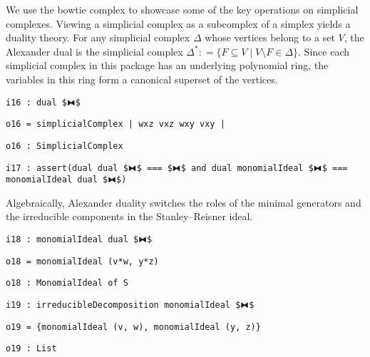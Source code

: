 \documentclass[12pt,leqno]{amsart}
\theoremstyle{definition}
\newcommand{\colequal}{\ensuremath{:\!=}}
\begin{document}
We use the bowtie complex to showcase some of the key operations on simplicial
complexes. Viewing a simplicial complex as a subcomplex of a simplex yields a
duality theory. For any simplicial complex $\Delta$ whose vertices belong to a
set $V$, the Alexander dual is the simplicial complex
$\Delta^* \colequal \{ F \subseteq V \mathrel{|} V \setminus F \in \Delta \}$.
Since each simplicial complex in this package has an underlying polynomial
ring, the variables in this ring form a canonical superset of the vertices.
\begin{lstlisting}[xleftmargin=10pt, aboveskip=3.0pt, belowskip=1.5pt]
i16 : dual $⧓$
\end{lstlisting}
\begin{lstlisting}[xleftmargin=10pt, aboveskip=1.5pt, belowskip=1.5pt]
o16 = simplicialComplex | wxz vxz wxy vxy |
\end{lstlisting}
\begin{lstlisting}[xleftmargin=10pt, aboveskip=1.5pt, belowskip=1.5pt]
o16 : SimplicialComplex
\end{lstlisting}
\begin{lstlisting}[xleftmargin=10pt, aboveskip=1.5pt, belowskip=1.5pt]
i17 : assert(dual dual $⧓$ === $⧓$ and dual monomialIdeal $⧓$ === monomialIdeal dual $⧓$)
\end{lstlisting}
Algebraically, Alexander duality switches the roles of the minimal generators
and the irreducible components in the Stanley--Reisner ideal.
\begin{lstlisting}[xleftmargin=10pt, aboveskip=3pt, belowskip=1.5pt]
i18 : monomialIdeal dual $⧓$
\end{lstlisting}
\begin{lstlisting}[xleftmargin=10pt, lineskip=-10pt, aboveskip=4pt, belowskip=1pt]
o18 = monomialIdeal (v*w, y*z)
\end{lstlisting}
\begin{lstlisting}[xleftmargin=10pt, aboveskip=1.5pt, belowskip=1.5pt]
o18 : MonomialIdeal of S
\end{lstlisting}
\begin{lstlisting}[xleftmargin=10pt, aboveskip=1.5pt, belowskip=1.5pt]
i19 : irreducibleDecomposition monomialIdeal $⧓$
\end{lstlisting}
\begin{lstlisting}[xleftmargin=10pt, lineskip=-10pt, aboveskip=4pt, belowskip=1pt]
o19 = {monomialIdeal (v, w), monomialIdeal (y, z)}
\end{lstlisting}
\begin{lstlisting}[xleftmargin=10pt, aboveskip=1pt, belowskip=3pt]
o19 : List
\end{lstlisting}
\end{document}
